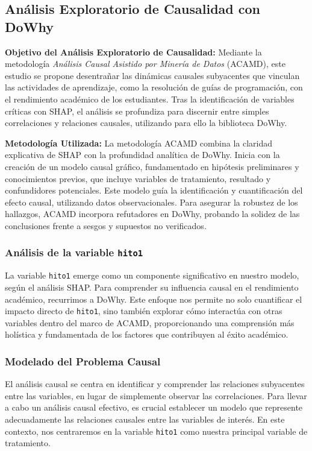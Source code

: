\subsection{Análisis Exploratorio de Causalidad con DoWhy}

\textbf{Objetivo del Análisis Exploratorio de Causalidad:} Mediante la metodología \textit{Análisis Causal Asistido por Minería de Datos} (ACAMD), este estudio se propone desentrañar las dinámicas causales subyacentes que vinculan las actividades de aprendizaje, como la resolución de guías de programación, con el rendimiento académico de los estudiantes. Tras la identificación de variables críticas con SHAP, el análisis se profundiza para discernir entre simples correlaciones y relaciones causales, utilizando para ello la biblioteca DoWhy.

\textbf{Metodología Utilizada:} La metodología ACAMD combina la claridad explicativa de SHAP con la profundidad analítica de DoWhy. Inicia con la creación de un modelo causal gráfico, fundamentado en hipótesis preliminares y conocimientos previos, que incluye variables de tratamiento, resultado y confundidores potenciales. Este modelo guía la identificación y cuantificación del efecto causal, utilizando datos observacionales. Para asegurar la robustez de los hallazgos, ACAMD incorpora refutadores en DoWhy, probando la solidez de las conclusiones frente a sesgos y supuestos no verificados.

\subsubsection{Análisis de la variable \texttt{hito1}}
La variable \texttt{hito1} emerge como un componente significativo en nuestro modelo, según el análisis SHAP. Para comprender su influencia causal en el rendimiento académico, recurrimos a DoWhy. Este enfoque nos permite no solo cuantificar el impacto directo de \texttt{hito1}, sino también explorar cómo interactúa con otras variables dentro del marco de ACAMD, proporcionando una comprensión más holística y fundamentada de los factores que contribuyen al éxito académico.

\subsubsection{Modelado del Problema Causal}

El análisis causal se centra en identificar y comprender las relaciones subyacentes entre las variables, en lugar de simplemente observar las correlaciones. Para llevar a cabo un análisis causal efectivo, es crucial establecer un modelo que represente adecuadamente las relaciones causales entre las variables de interés. En este contexto, nos centraremos en la variable \texttt{hito1} como nuestra principal variable de tratamiento.

